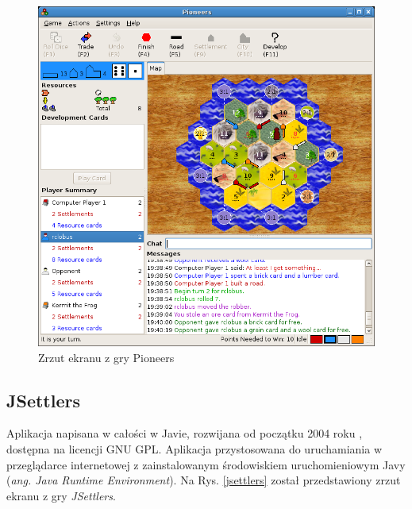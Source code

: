 \documentclass[a4paper,12pt]{article}
\providecommand{\imref}[1]{Rys. \ref{#1}} %
\begin{document}
\begin{figure}[ht]
  \begin{center}
    \includegraphics[width=\linewidth]{pioneers.png}
  \end{center}
  \caption{Zrzut ekranu z gry Pioneers}
  \label{pioneers}
\end{figure}

\subsection{JSettlers}
Aplikacja napisana w całości w Javie, rozwijana od początku 2004 roku
\cite{jsettlers}, dostępna na licencji GNU GPL. Aplikacja
przystosowana do uruchamiania w przeglądarce internetowej z
zainstalowanym środowiskiem uruchomieniowym Javy (\emph{ang. Java Runtime
  Environment}). Na \imref{jsettlers} został przedstawiony zrzut
ekranu z gry \emph{JSettlers}.
\end{document}
